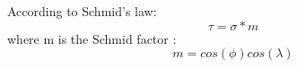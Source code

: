 \documentclass[journal,article,submit,moreauthors,pdftex,10pt,a4paper]{Definitions/mdpi}
\begin{document}
According to Schmid's law:
	$$\tau = \sigma*m$$
where m is the Schmid factor :
	$$ m = cos(\phi)cos(\lambda)$$
%	
%	
%	
%	
%	
%	
%	
%	
%	
%	
%	
%	
%	
%	
%	
	
\end{document}
